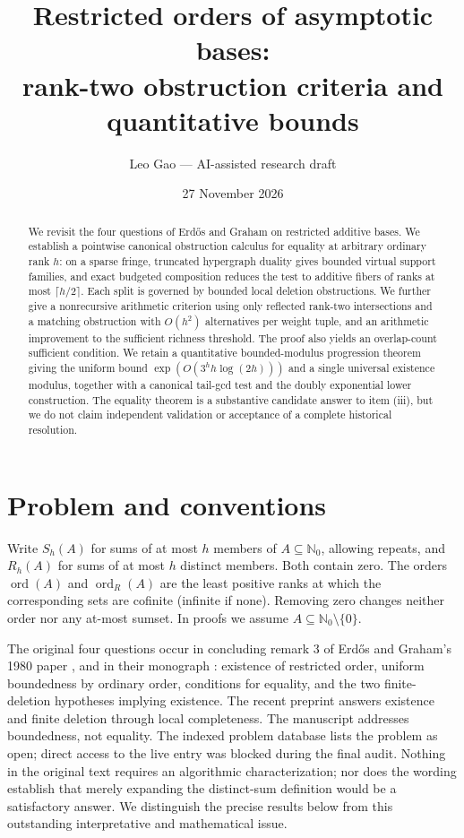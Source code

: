 \documentclass[11pt]{article}
\title{Restricted orders of asymptotic bases:\\ rank-two obstruction criteria and quantitative bounds}
\author{Leo Gao --- AI-assisted research draft}
\date{27 November 2026}
\theoremstyle{remark}\newtheorem{remark}[theorem]{Remark}
\newcommand{\N}{\mathbb N_0}
\newcommand{\ord}{\operatorname{ord}}
\newcommand{\ordR}{\operatorname{ord}_{R}}
\begin{document}
\maketitle
\begin{abstract}
We revisit the four questions of Erd\H{o}s and Graham on restricted additive bases. We establish a pointwise canonical obstruction calculus for equality at arbitrary ordinary rank $h$: on a sparse fringe, truncated hypergraph duality gives bounded virtual support families, and exact budgeted composition reduces the test to additive fibers of ranks at most $\lceil h/2\rceil$. Each split is governed by bounded local deletion obstructions. We further give a nonrecursive arithmetic criterion using only reflected rank-two intersections and a matching obstruction with $O(h^2)$ alternatives per weight tuple, and an arithmetic improvement to the sufficient richness threshold. The proof also yields an overlap-count sufficient condition. We retain a quantitative bounded-modulus progression theorem giving the uniform bound $\exp(O(3^h h\log(2h)))$ and a single universal existence modulus, together with a canonical tail-gcd test and the doubly exponential lower construction. The equality theorem is a substantive candidate answer to item (iii), but we do not claim independent validation or acceptance of a complete historical resolution.
\end{abstract}
\section{Problem and conventions}
Write $S_h(A)$ for sums of at most $h$ members of $A\subseteq\N$, allowing repeats, and $R_h(A)$ for sums of at most $h$ distinct members. Both contain zero. The orders $\ord(A)$ and $\ordR(A)$ are the least positive ranks at which the corresponding sets are cofinite (infinite if none). Removing zero changes neither order nor any at-most sumset. In proofs we assume $A\subseteq\N\setminus\{0\}$.

The original four questions occur in concluding remark 3 of Erd\H{o}s and Graham's 1980 paper \cite[p. 206]{EG}, and in their monograph \cite[p. 52]{EGbook}: existence of restricted order, uniform boundedness by ordinary order, conditions for equality, and the two finite-deletion hypotheses implying existence. The recent preprint \cite{CYZ} answers existence and finite deletion through local completeness. The manuscript \cite{Gao} addresses boundedness, not equality. The indexed problem database \cite{database} lists the problem as open; direct access to the live entry was blocked during the final audit. Nothing in the original text requires an algorithmic characterization; nor does the wording establish that merely expanding the distinct-sum definition would be a satisfactory answer. We distinguish the precise results below from this outstanding interpretative and mathematical issue.
\end{document}
